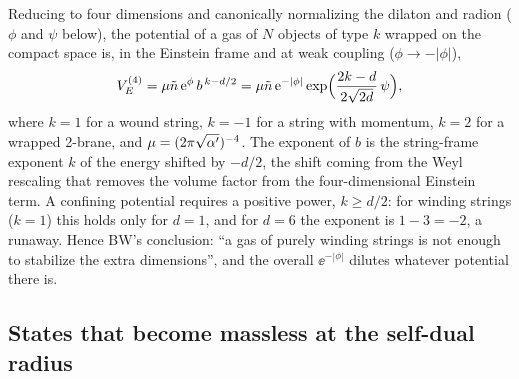 Reducing to four dimensions and canonically normalizing the dilaton and radion ($\phi$ and
$\psi$ below), the potential of a gas of $N$ objects of type $k$ wrapped on the compact
space is, in the Einstein frame and at weak coupling ($\phi\to-|\phi|$),
\begin{equation}\label{eq:cosmology:Vwind}
 V_E^{(4)}=\mu\tilde n\,\mathrm{e}^{\phi}\,b^{\,k-d/2}
 =\mu\tilde n\,\mathrm{e}^{-|\phi|}\exp\Bigl(\frac{2k-d}{2\sqrt{2d}}\,\psi\Bigr),
\end{equation}
where $k=1$ for a wound string, $k=-1$ for a string with momentum, $k=2$ for a wrapped
2-brane, and $\mu=(2\pi\sqrt{\alpha'})^{-4}$. The exponent of $b$ is the string-frame exponent
$k$ of the energy shifted by $-d/2$, the shift coming from the Weyl rescaling that removes
the volume factor from the four-dimensional Einstein term. A confining potential requires a
positive power, $k\ge d/2$: for winding strings ($k=1$) this holds only for $d=1$, and for
$d=6$ the exponent is $1-3=-2$, a runaway. Hence BW's conclusion: ``a gas of purely winding
strings is not enough to stabilize the extra dimensions'', and the overall $\ee^{-|\phi|}$
dilutes whatever potential there is. 

\subsection{States that become massless at the self-dual radius}

